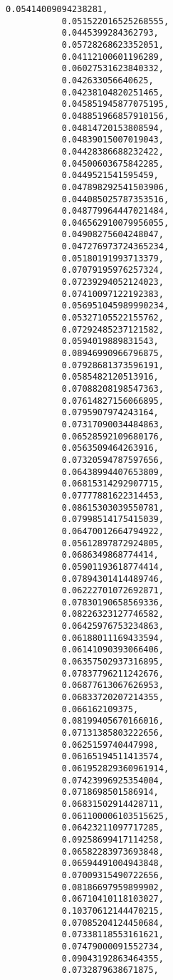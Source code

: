 \documentclass[11pt]{article}
\begin{document}
\begin{Verbatim}[commandchars=\\\{\}]
           0.05414009094238281,
           0.051522016525268555,
           0.0445399284362793,
           0.05728268623352051,
           0.04112100601196289,
           0.06027531623840332,
           0.042633056640625,
           0.04238104820251465,
           0.045851945877075195,
           0.048851966857910156,
           0.04814720153808594,
           0.04839015007019043,
           0.04428386688232422,
           0.04500603675842285,
           0.0449521541595459,
           0.047898292541503906,
           0.044085025787353516,
           0.048779964447021484,
           0.046562910079956055,
           0.04908275604248047,
           0.047276973724365234,
           0.05180191993713379,
           0.07079195976257324,
           0.07239294052124023,
           0.07410097122192383,
           0.056951045989990234,
           0.05327105522155762,
           0.07292485237121582,
           0.0594019889831543,
           0.08946990966796875,
           0.07928681373596191,
           0.0585482120513916,
           0.07088208198547363,
           0.07614827156066895,
           0.0795907974243164,
           0.07317090034484863,
           0.06528592109680176,
           0.0563509464263916,
           0.07320594787597656,
           0.06438994407653809,
           0.06815314292907715,
           0.07777881622314453,
           0.08615303039550781,
           0.07998514175415039,
           0.06470012664794922,
           0.05612897872924805,
           0.0686349868774414,
           0.05901193618774414,
           0.07894301414489746,
           0.06222701072692871,
           0.07830190658569336,
           0.08226323127746582,
           0.06425976753234863,
           0.06188011169433594,
           0.06141090393066406,
           0.06357502937316895,
           0.07837796211242676,
           0.06877613067626953,
           0.06833720207214355,
           0.066162109375,
           0.08199405670166016,
           0.07131385803222656,
           0.0625159740447998,
           0.06165194511413574,
           0.061952829360961914,
           0.07423996925354004,
           0.0718698501586914,
           0.06831502914428711,
           0.061100006103515625,
           0.06423211097717285,
           0.09258699417114258,
           0.06582283973693848,
           0.06594491004943848,
           0.07009315490722656,
           0.08186697959899902,
           0.06710410118103027,
           0.10370612144470215,
           0.07085204124450684,
           0.07338118553161621,
           0.07479000091552734,
           0.09043192863464355,
           0.0732879638671875,

\end{Verbatim}
\end{document}
